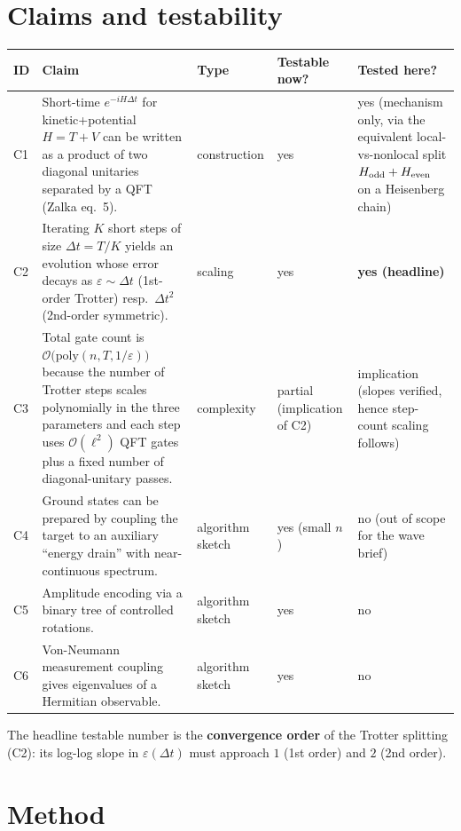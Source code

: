 \documentclass[11pt]{article}
\begin{document}
\section{Claims and testability}
\begin{center}
\small
\begin{tabular}{lp{6.8cm}lll}
\toprule
ID & Claim & Type & Testable now? & Tested here? \\
\midrule
C1 & Short-time $e^{-iH\Delta t}$ for kinetic+potential $H=T+V$ can be
     written as a product of two diagonal unitaries separated by a QFT
     (Zalka eq.~5). & construction & yes & yes (mechanism only,
     via the equivalent local-vs-nonlocal split $H_{\rm odd}+H_{\rm even}$
     on a Heisenberg chain) \\
C2 & Iterating $K$ short steps of size $\Delta t=T/K$ yields an
     evolution whose error decays as $\varepsilon\sim\Delta t$
     (1st-order Trotter) resp.\ $\Delta t^2$ (2nd-order symmetric). &
     scaling & yes & \textbf{yes (headline)} \\
C3 & Total gate count is
     $\mathcal O\bigl(\mathrm{poly}(n,T,1/\varepsilon)\bigr)$
     because the number of Trotter steps scales polynomially in the
     three parameters and each step uses $\mathcal O(\ell^2)$ QFT gates
     plus a fixed number of diagonal-unitary passes. & complexity &
     partial (implication of C2) & implication (slopes verified,
     hence step-count scaling follows) \\
C4 & Ground states can be prepared by coupling the target to an
     auxiliary ``energy drain'' with near-continuous spectrum. &
     algorithm sketch & yes (small $n$) & no (out of scope for
     the wave brief) \\
C5 & Amplitude encoding via a binary tree of controlled rotations. &
     algorithm sketch & yes & no \\
C6 & Von-Neumann measurement coupling gives eigenvalues of a Hermitian
     observable. & algorithm sketch & yes & no \\
\bottomrule
\end{tabular}
\end{center}

The headline testable number is the \textbf{convergence order} of the
Trotter splitting (C2): its log-log slope in
$\varepsilon(\Delta t)$ must approach $1$ (1st order) and $2$ (2nd order).

\section{Method}
\end{document}
